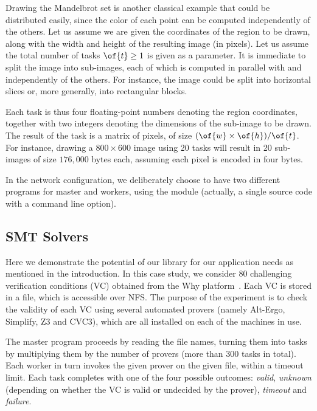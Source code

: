 \documentclass[a4paper,12pt]{article}
\begin{document}
Drawing the Mandelbrot set is another classical example that could be
distributed easily, since the color of each point can be computed
independently of the others. 
Let us assume we are given the coordinates of the region to be drawn,
along with the width  and height  of the resulting image
(in pixels). 
Let us assume the total number of tasks $\of{t} \ge 1$ is given as a
parameter. It is immediate to split the image into  sub-images,
each of which is computed in parallel with and independently of the
others. For instance, the image could be split into horizontal slices
or, more generally, into rectangular blocks.

Each task is thus four floating-point numbers denoting the region
coordinates, together with two integers denoting the dimensions of the
sub-image to be drawn. The result of the task is a matrix of pixels,
of size $(\of{w}\times\of{h}) / \of{t}$. 
For instance, drawing a $800\times 600$ image using 20 tasks will
result in 20 sub-images of size $176,000$ bytes each,
assuming each pixel is encoded in four bytes.

In the network configuration, we deliberately choose to have two
different programs for master and workers, using the 
module (actually, a single source code with a command line option).


\subsection{SMT Solvers}\label{sec:SMT}

Here we demonstrate the potential of our library for our application
needs as mentioned in the introduction. In this case study,
we consider 80 challenging verification conditions
(VC) obtained from the Why platform~\cite{filliatre07cav}.  Each
VC is stored in a file, which is accessible over
NFS. The purpose of the experiment is to check the validity of each VC
using several automated provers (namely Alt-Ergo, Simplify, Z3 and CVC3),
which are all installed on each of the machines in use.

The master program proceeds by reading the file names, turning them
into tasks by multiplying them by the number of provers (more than
300 tasks in total).
Each worker in turn invokes the given prover on the given file, within
a timeout limit.
Each task completes with one of the four possible outcomes: \emph{valid},
\emph{unknown} (depending on
whether the VC is valid or undecided by the prover), 
\emph{timeout} and \emph{failure}.
\end{document}
